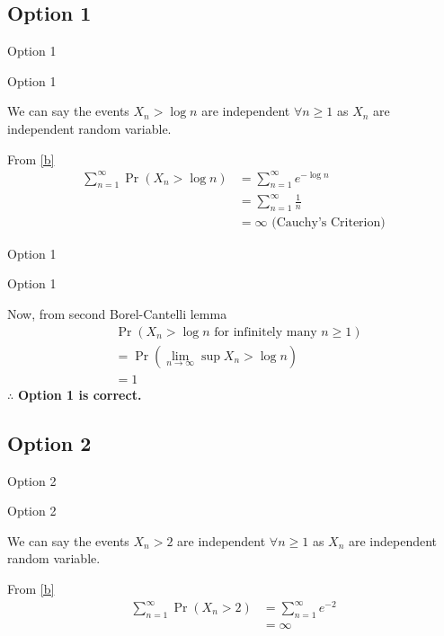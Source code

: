 \documentclass{beamer}
\providecommand{\pr}[1]{\ensuremath{\Pr\left(#1\right)}}
\providecommand{\pr}[1]{\ensuremath{\Pr\left(#1\right)}}
\theoremstyle{remark}
\numberwithin{equation}{subsection}
\begin{document}
\subsection{Option 1}
\begin{frame}{Option 1}
\begin{block}{Option 1}

We can say the events $X_n>\log n$ are independent $\forall n\geq 1$ as $X_n$ are independent random variable.
    
    From \eqref{b}
    \begin{align}
        \sum_{n=1}^{\infty}\pr{X_n > \log n} &=\sum_{n=1}^{\infty}e^{-\log n}\nonumber\\ &=\sum_{n=1}^{\infty}\frac{1}{n}\nonumber\\
                                            &= \infty \text{ (Cauchy's Criterion)}\nonumber
    \end{align}
   
\end{block}
\end{frame}

\begin{frame}{Option 1}
\begin{block}{Option 1}

    Now, from second Borel-Cantelli lemma
    \begin{align}
        &\pr{X_n>\log n \text{ for infinitely many }n\geq1}\nonumber\\
        &=\pr{\lim_{n \rightarrow \infty}\sup X_n>\log n}\nonumber\\
        &=1\nonumber
    \end{align}
    $\therefore$ \textbf{Option 1 is correct. }

\end{block}
\end{frame}



\subsection{Option 2}
\begin{frame}{Option 2}
\begin{block}{Option 2}

 We can say the events $X_n>2$ are independent $\forall n\geq 1$ as $X_n$ are independent random variable.
    
    From \eqref{b}
    \begin{align}
        \sum_{n=1}^{\infty}\pr{X_n > 2} &= \sum_{n=1}^{\infty}e^{-2}\nonumber\\
                                            &= \infty\nonumber
    \end{align}
   
\end{block}
\end{frame}
\end{document}
